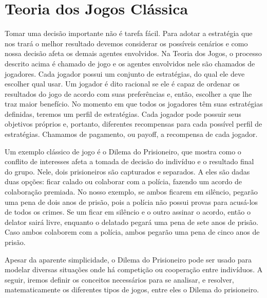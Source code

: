 \chapter{Teoria dos Jogos Clássica}

Tomar uma decisão importante não é tarefa fácil. Para adotar a estratégia que nos trará o melhor resultado devemos considerar os possíveis cenários e como nossa decisão afeta os demais agentes envolvidos. Na Teoria dos Jogos, o processo descrito acima é chamado de jogo e os agentes envolvidos nele são chamados de jogadores. Cada jogador possui um conjunto de estratégias, do qual ele deve escolher qual usar. Um jogador é dito racional se ele é capaz de ordenar os resultados do jogo de acordo com suas preferências e, então, escolher a que lhe traz maior benefício. No momento em que todos os jogadores têm suas estratégias definidas, teremos um perfil de estratégias. Cada jogador pode possuir seus objetivos próprios e, portanto, diferentes recompensas para cada possível perfil de estratégias. Chamamos de pagamento, ou payoff, a recompensa de cada jogador.

Um exemplo clássico de jogo é o Dilema do Prisioneiro, que mostra como o conflito de interesses afeta a tomada de decisão do indivíduo e o resultado final do grupo. Nele, dois prisioneiros são capturados e separados. A eles são dadas duas opções: ficar calado ou colaborar com a polícia, fazendo um acordo de colaboração premiada. No nosso exemplo, se ambos ficarem em silêncio, pegarão uma pena de dois anos de prisão, pois a polícia não possui provas para acusá-los de todos os crimes. Se um ficar em silêncio e o outro assinar o acordo, então o delator sairá livre, enquanto o delatado pegará uma pena de sete anos de prisão. Caso ambos colaborem com a polícia, ambos pegarão uma pena de cinco anos de prisão.

Apesar da aparente simplicidade, o Dilema do Prisioneiro pode ser usado para modelar diversas situações onde há competição ou cooperação entre indivíduos. A seguir, iremos definir os conceitos necessários para se analisar, e resolver, matematicamente os diferentes tipos de jogos, entre eles o Dilema do prisioneiro.


